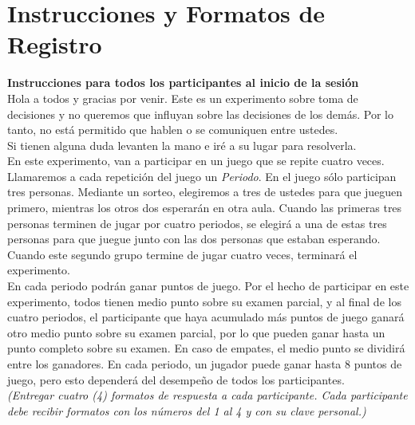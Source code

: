 
\chapter{Instrucciones y Formatos de Registro} %

\label{App_Inst} %

\textbf{Instrucciones para todos los participantes al inicio de la sesión}\\

Hola a todos y gracias por venir. Este es un experimento sobre toma de decisiones y no queremos que influyan sobre las decisiones de los demás. Por lo tanto, no está permitido que hablen o se comuniquen entre ustedes.\\

Si tienen alguna duda levanten la mano e iré a su lugar para resolverla.\\

En este experimento, van a participar en un juego que se repite cuatro veces. Llamaremos a cada repetición del juego un \textit{Periodo}. En el juego sólo participan tres personas. Mediante un sorteo, elegiremos a tres de ustedes para que jueguen primero, mientras los otros dos esperarán en otra aula. Cuando las primeras tres personas terminen de jugar por cuatro periodos, se elegirá a una de estas tres personas para que juegue junto con las dos personas que estaban esperando. Cuando este segundo grupo termine de jugar cuatro veces, terminará el experimento.\\

En cada periodo podrán ganar puntos de juego. Por el hecho de participar en este experimento, todos tienen medio punto sobre su examen parcial, y al final de los cuatro periodos, el participante que haya acumulado más puntos de juego ganará otro medio punto sobre su examen parcial, por lo que pueden ganar hasta un punto completo sobre su examen. En caso de empates, el medio punto se dividirá entre los ganadores. En cada periodo, un jugador puede ganar hasta 8 puntos de juego, pero esto dependerá del desempeño de todos los participantes.\\

\textit{(Entregar cuatro (4) formatos de respuesta a cada participante. Cada participante debe recibir formatos con los números del 1 al 4 y con su clave personal.)}\\

